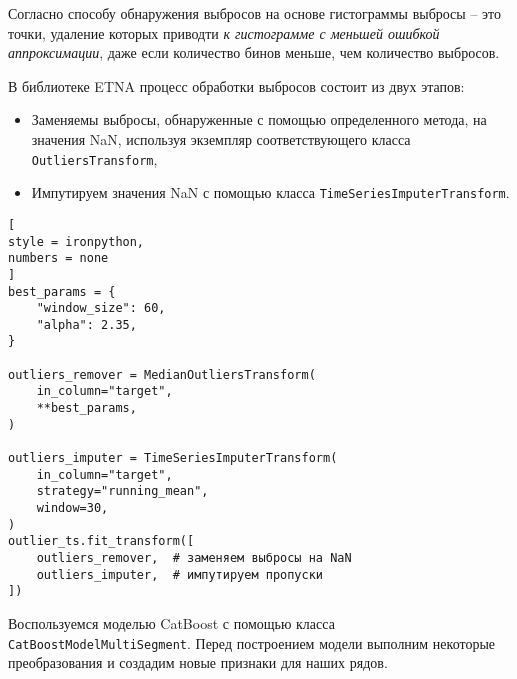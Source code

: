 \documentclass[%
	11pt,
	a4paper,
	utf8,
		]{article}
\begin{document}
Согласно способу обнаружения выбросов на основе гистограммы выбросы -- это точки, удаление которых приводти \emph{к гистограмме с меньшей ошибкой аппроксимации}, даже если количество бинов меньше, чем количество выбросов.

В библиотеке ETNA процесс обработки выбросов состоит из двух этапов:
\begin{itemize}
	\item Заменяемы выбросы, обнаруженные с помощью определенного метода, на значения NaN, используя экземпляр соответствующего класса \verb|OutliersTransform|,
	
	\item Импутируем значения NaN с помощью класса \verb|TimeSeriesImputerTransform|.
\end{itemize}

\begin{lstlisting}[
style = ironpython,
numbers = none
]
best_params = {
    "window_size": 60,
    "alpha": 2.35,
}

outliers_remover = MedianOutliersTransform(
    in_column="target",
    **best_params,
)

outliers_imputer = TimeSeriesImputerTransform(
    in_column="target",
    strategy="running_mean",
    window=30,
)
outlier_ts.fit_transform([
    outliers_remover,  # заменяем выбросы на NaN
    outliers_imputer,  # импутируем пропуски
])
\end{lstlisting}

Воспользуемся моделью CatBoost с помощью класса \verb|CatBoostModelMultiSegment|. Перед построением модели выполним некоторые преобразования и создадим новые признаки для наших рядов. 
\end{document}
